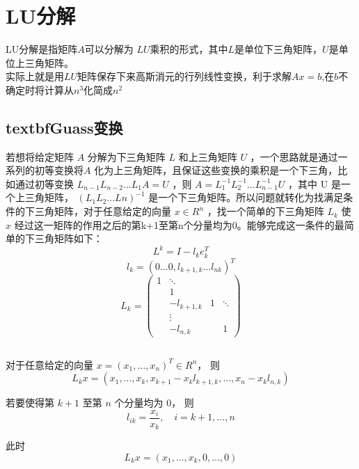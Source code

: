 \section{\textbf{LU分解}}
LU分解是指矩阵$A$可以分解为 $LU$乘积的形式，其中$L$是单位下三角矩阵，$U$是单位上三角矩阵。\\
实际上就是用$LU$矩阵保存下来高斯消元的行列线性变换，利于求解$Ax=b$,在$b$不确定时将计算从$n^3$化简成$n^2$
\subsection{textbf{Guass变换}}
若想将给定矩阵 $A$
 分解为下三角矩阵 $L$
 和上三角矩阵 $U$
 ，一个思路就是通过一系列的初等变换将$A$ 
 化为上三角矩阵，且保证这些变换的乘积是一个下三角，比如通过初等变换 $L_{n-1} L_{n-2} ...L_{1}A=U$
 ，则 $A=L_{1}^{-1}L_{2}^{-1}...L_{n-1}^{-1}U$
，其中 U
 是一个上三角矩阵，  $(L_{1}L_{2}...L{n})^{-1}$
 是一个下三角矩阵。所以问题就转化为找满足条件的下三角矩阵，对于任意给定的向量 $x\in R^{n}$
 ，找一个简单的下三角矩阵 $L_{k}$
 使 $x$
 经过这一矩阵的作用之后的第k+1至第n个分量均为0。能够完成这一条件的最简单的下三角矩阵如下：
 \begin{equation}
    L^k = I-l_{k}e_{k}^{T}
 \end{equation}
 \begin{equation}
    l_{k}=\left(0 \ldots 0, l_{k+1, k} \ldots l_{n k}\right)^{T}
 \end{equation}
 \begin{equation}
   L_{k}=\left(\begin{array}{cccc}
        1 & \ddots & & \\
        & 1 & & \\
        & -l_{k+1, k} & 1 & \ddots \\
        & \vdots & & \\
        & -l_{n, k} & & 1
        \end{array}\right)
 \end{equation}
 \subsection{}
 对于任意给定的向量 \( x = (x_1, \ldots, x_n)^T \in R^n \)，
 则  
 \[
 L_k x = (x_1, \ldots, x_k, x_{k+1} - x_k l_{k+1, k}, \ldots, x_n - x_k l_{n, k})
 \]  
 
 若要使得第 \( k+1 \) 至第 \( n \) 个分量均为 0，
 则  
 \[
 l_{ik} = \frac{x_i}{x_k}, \quad i = k+1, \ldots, n
 \]  
 
 此时  
 \[
 L_k x = (x_1, \ldots, x_k, 0, \ldots, 0)
 \]  
 
